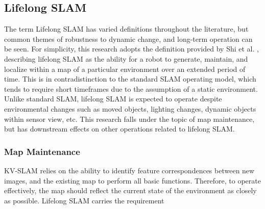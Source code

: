 \subsection{Lifelong SLAM}

The term Lifelong SLAM has varied definitions throughout the literature, but common themes of robustness to dynamic change, and long-term operation can be seen. For simplicity, this research adopts the definition provided by Shi et al. \cite{shiAreWeReady2020}, describing lifelong SLAM as the ability for a robot to generate, maintain, and localize within a map of a particular environment over an extended period of time. This is in contradistinction to the standard SLAM operating model, which tends to require short timeframes due to the assumption of a static environment. Unlike standard SLAM, lifelong SLAM is expected to operate despite environmental changes such as moved objects, lighting changes, dynamic objects within sensor view, etc. This research falls under the topic of map maintenance, but has downstream effects on other operations related to lifelong SLAM.

\subsubsection{Map Maintenance}

KV-SLAM relies on the ability to identify feature correspondences between new images, and the existing map to perform all basic functions. Therefore, to operate effectively, the map should reflect the current state of the environment as closely as possible. Lifelong SLAM carries the requirement 